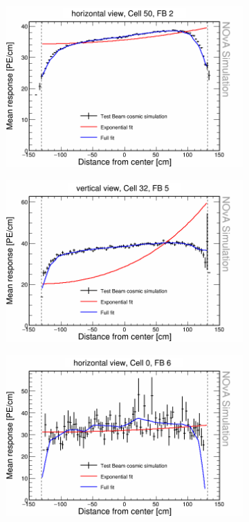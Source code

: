 \begin{figure}[h]
  \begin{subfigure}{0.5\textwidth}
    \includegraphics[width=\linewidth]{RelativeCalibrationResults/sim_fb2_001_050.png}
  \end{subfigure}
  \begin{subfigure}{0.5\textwidth}
    \includegraphics[width=\linewidth]{RelativeCalibrationResults/sim_fb5_000_032.png}
  \end{subfigure}
  \begin{subfigure}{0.5\textwidth}
    \includegraphics[width=\linewidth]{RelativeCalibrationResults/sim_fb6_001_000.png}

\end{subfigure}
\end{figure}
